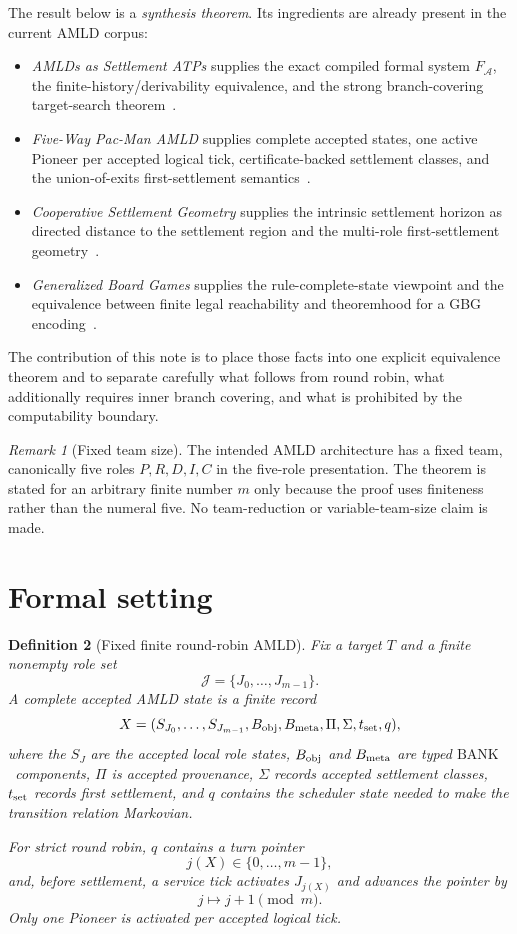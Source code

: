 \documentclass[11pt]{article}
\newtheorem{definition}{Definition}[section]
\theoremstyle{remark}
\newtheorem{remark}[definition]{Remark}
\newcommand{\BANK}{\ensuremath{\mathrm{BANK}}}
\begin{document}
The result below is a \emph{synthesis theorem}.  Its ingredients are already present in the current AMLD corpus:
\begin{itemize}
\item \emph{AMLDs as Settlement ATPs} supplies the exact compiled formal system $F_{\mathcal A}$, the finite-history/derivability equivalence, and the strong branch-covering target-search theorem~\cite{SettlementATP}.
\item \emph{Five-Way Pac-Man AMLD} supplies complete accepted states, one active Pioneer per accepted logical tick, certificate-backed settlement classes, and the union-of-exits first-settlement semantics~\cite{PacMan}.
\item \emph{Cooperative Settlement Geometry} supplies the intrinsic settlement horizon as directed distance to the settlement region and the multi-role first-settlement geometry~\cite{CSG}.
\item \emph{Generalized Board Games} supplies the rule-complete-state viewpoint and the equivalence between finite legal reachability and theoremhood for a GBG encoding~\cite{GBG}.
\end{itemize}

The contribution of this note is to place those facts into one explicit equivalence theorem and to separate carefully what follows from round robin, what additionally requires inner branch covering, and what is prohibited by the computability boundary.

\begin{remark}[Fixed team size]
The intended AMLD architecture has a fixed team, canonically five roles $P,R,D,I,C$ in the five-role presentation.  The theorem is stated for an arbitrary finite number $m$ only because the proof uses finiteness rather than the numeral five.  No team-reduction or variable-team-size claim is made.
\end{remark}

\section{Formal setting}

\begin{definition}[Fixed finite round-robin AMLD]
Fix a target $T$ and a finite nonempty role set
\[
\mathcal J=\{J_0,\ldots,J_{m-1}\}.
\]
A complete accepted AMLD state is a finite record
\[
X=(S_{J_0},\ldots,S_{J_{m-1}},B_{\rm obj},B_{\rm meta},\Pi,\Sigma,t_{\rm set},q),
\]
where the $S_J$ are the accepted local role states, $B_{\rm obj}$ and $B_{\rm meta}$ are typed \BANK\ components, $\Pi$ is accepted provenance, $\Sigma$ records accepted settlement classes, $t_{\rm set}$ records first settlement, and $q$ contains the scheduler state needed to make the transition relation Markovian.

For strict round robin, $q$ contains a turn pointer
\[
j(X)\in\{0,\ldots,m-1\},
\]
and, before settlement, a service tick activates $J_{j(X)}$ and advances the pointer by
\[
j\longmapsto j+1\pmod m.
\]
Only one Pioneer is activated per accepted logical tick.
\end{definition}
\end{document}
